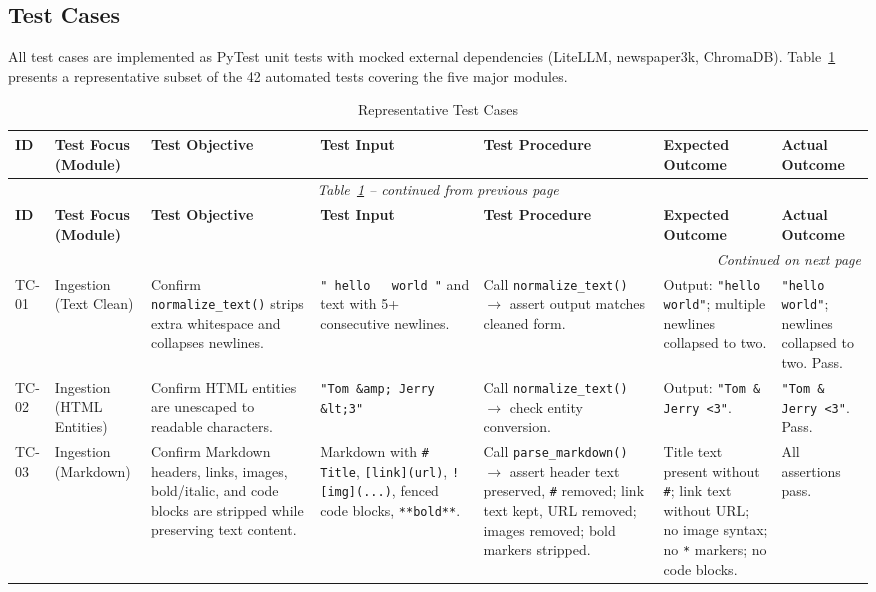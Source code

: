 \documentclass[sigconf,natbib=false]{acmart}   %
\begin{document}
\subsection{Test Cases}
All test cases are implemented as PyTest unit tests with mocked external dependencies (LiteLLM, newspaper3k, ChromaDB).  Table~\ref{tab:testcases} presents a representative subset of the 42 automated tests covering the five major modules.

{\small
\begin{longtable}{|p{0.6cm}|p{1.4cm}|p{2.0cm}|p{2.3cm}|p{2.3cm}|p{2.3cm}|p{2.3cm}|}
\caption{Representative Test Cases}\label{tab:testcases}\\
\hline
\textbf{ID} & \textbf{Test Focus (Module)} & \textbf{Test Objective} & \textbf{Test Input} & \textbf{Test Procedure} & \textbf{Expected Outcome} & \textbf{Actual Outcome}\\
\hline
\endfirsthead
\multicolumn{7}{c}{\textit{Table~\ref{tab:testcases} -- continued from previous page}}\\
\hline
\textbf{ID} & \textbf{Test Focus (Module)} & \textbf{Test Objective} & \textbf{Test Input} & \textbf{Test Procedure} & \textbf{Expected Outcome} & \textbf{Actual Outcome}\\
\hline
\endhead
\hline
\multicolumn{7}{r}{\textit{Continued on next page}}\\
\endfoot
\hline
\endlastfoot

TC-01 & Ingestion (Text Clean) & Confirm \texttt{normalize\_text()} strips extra whitespace and collapses newlines. & \texttt{"~hello~~~world~"} and text with 5+ consecutive newlines. & Call \texttt{normalize\_text()} $\to$ assert output matches cleaned form. & Output: \texttt{"hello world"}; multiple newlines collapsed to two. & \texttt{"hello world"}; newlines collapsed to two. Pass.\\
\hline

TC-02 & Ingestion (HTML Entities) & Confirm HTML entities are unescaped to readable characters. & \texttt{"Tom \&amp; Jerry \&lt;3"} & Call \texttt{normalize\_text()} $\to$ check entity conversion. & Output: \texttt{"Tom \& Jerry <3"}. & \texttt{"Tom \& Jerry <3"}. Pass.\\
\hline

TC-03 & Ingestion (Markdown) & Confirm Markdown headers, links, images, bold/italic, and code blocks are stripped while preserving text content. & Markdown with \texttt{\# Title}, \texttt{[link](url)}, \texttt{![img](...)}, fenced code blocks, \texttt{**bold**}. & Call \texttt{parse\_markdown()} $\to$ assert header text preserved, \texttt{\#} removed; link text kept, URL removed; images removed; bold markers stripped. & Title text present without \texttt{\#}; link text without URL; no image syntax; no \texttt{*} markers; no code blocks. & All assertions pass.\\
\hline


\end{longtable}}
\end{document}
